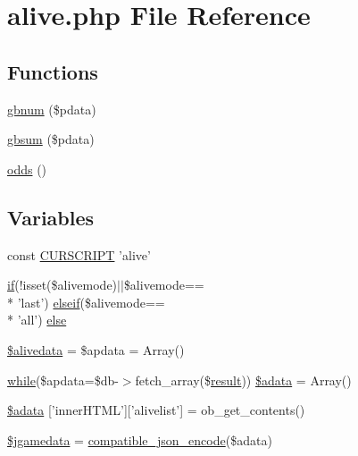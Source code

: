 \hypertarget{alive_8php}{\section{alive.\+php File Reference}
\label{alive_8php}
}
\subsection*{Functions}
\begin{DoxyCompactItemize}
\item 
\hyperlink{alive_8php_a8408937fd012953a400143d020f84b4b}{gbnum} (\$pdata)
\item 
\hyperlink{alive_8php_a5f2a249a5f09d7d928b6ece41e6fe01b}{gbsum} (\$pdata)
\item 
\hyperlink{alive_8php_a5caeba264d8d4e856469c423560848d6}{odds} ()
\end{DoxyCompactItemize}
\subsection*{Variables}
\begin{DoxyCompactItemize}
\item 
const \hyperlink{alive_8php_a39c39f525eceb86cabc338804f230e80}{C\+U\+R\+S\+C\+R\+I\+P\+T} 'alive'
\item 
\hyperlink{login__old_8php_a4ac1118c2e44c513a674bc1793ba6c90}{if}(!isset(\$alivemode)$\vert$$\vert$\$alivemode== \\*
'last') \hyperlink{urlist_8php_a77f52b43f81ed05a41b68c2161789055}{elseif}(\$alivemode== \\*
'all') \hyperlink{alive_8php_ad881d5d00713ee38bbdc36a556e20f9b}{else}
\item 
\hyperlink{alive_8php_a2a073f681012b1c4833ff46628277e6c}{\$alivedata} = \$apdata = Array()
\item 
\hyperlink{stat_8php_ab54633a8fada54bedd1fe3c2635cfaeb}{while}(\$apdata=\$db-\/$>$fetch\+\_\+array(\$\hyperlink{templates_2install_8php_abdecde238169a1e34f68354fc9968af0}{result})) \hyperlink{alive_8php_a8741d25e3504c1625a3448d0f648a530}{\$adata} = Array()
\item 
\hyperlink{alive_8php_a96ac8e7c585d920222762dce8dafb1db}{\$adata} \mbox{[}'inner\+H\+T\+M\+L'\mbox{]}\mbox{[}'alivelist'\mbox{]} = ob\+\_\+get\+\_\+contents()
\item 
\hyperlink{alive_8php_ad8ad32ee4a34333c6c5c5b4379a80cf2}{\$jgamedata} = \hyperlink{global_8func_8php_a90ee856f9044b751e8c137763608fba4}{compatible\+\_\+json\+\_\+encode}(\$adata)
\end{DoxyCompactItemize}


